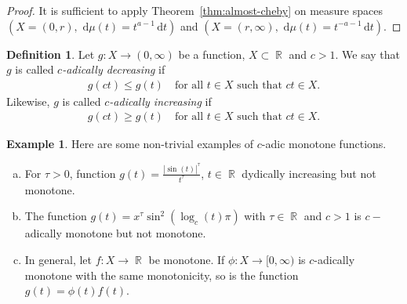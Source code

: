 \documentclass[12pt, reqno]{amsart}%
\theoremstyle{plain}  %
\theoremstyle{definition}  %
\newtheorem{definition}[theorem]{Definition}
\newtheorem{example}[theorem]{Example}
\theoremstyle{remark}
\numberwithin{equation}{section}
\DeclareMathOperator{\R}{\mathbb{R}}
\renewcommand{\d}{\,\mathrm{d}}
\begin{document}
\begin{proof}
It is sufficient to apply Theorem~\ref{thm:almost-cheby} on measure spaces
$(X=(0,r),\,\d\mu(t)= t^{a-1}\d t)$ and
$(X=(r,\infty),\,\d\mu(t)= t^{-a-1}\d t)$.
\end{proof}

\begin{definition}
Let $g : X \to (0,\infty)$ be a function, $X \subset \R$ and $c>1$. We say that $g$ is called
\emph{$c$-adically decreasing} if
\begin{align*}
g(ct) \leq g(t)
\quad \text{for all } t \in X \text{ such that } ct \in X .
\end{align*}
Likewise, $g$ is called \emph{$c$-adically increasing} if
\begin{align*}
g(ct) \geq g(t)
\quad \text{for all } t \in X \text{ such that } ct \in X .
\end{align*}
\end{definition}

\begin{example}
Here are some non-trivial examples of $c$-adic monotone functions.
\begin{enumerate}[(a)]
\item For $\tau>0$, function $g(t)=\frac{|\sin (t)|^\tau}{t^\tau}$, $t\in \R$ dydically increasing but not monotone.
\item The function $g(t) = x^\tau\sin^2(\log_c(t)\pi)$ with $\tau\in \R$ and $c>1$ is $c-$adically monotone but not monotone.
\item In general, let $f:X\to \R$ be monotone. If $\phi:X \to [0, \infty)$ is $c$-adically monotone  with the same monotonicity, so is the function $g(t)= \phi(t) f(t)$.
\end{enumerate}
\end{example}
\end{document}
